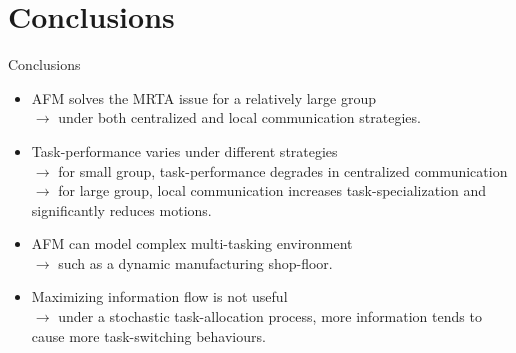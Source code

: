 \documentclass{beamer}
\begin{document}
\section{Conclusions}
\begin{frame}[t]{Conclusions}
\begin{itemize}
    \item \normalsize \alert{AFM solves the MRTA issue for a relatively large group}\\
    $\rightarrow$ \small under both centralized and local communication strategies.
    \item \normalsize \alert{Task-performance varies under different strategies}\\
    $\rightarrow$ \small for small group, task-performance degrades in centralized communication\\
    $\rightarrow$ \small for large group, local  communication increases task-specialization and significantly reduces motions.    
    \item \normalsize \alert{AFM can model complex multi-tasking environment}\\
    $\rightarrow$ \small such as a dynamic manufacturing shop-floor.
    \item \normalsize \alert{Maximizing information flow is not useful}\\
    $\rightarrow$ \small  under a stochastic task-allocation process, more information tends to cause more task-switching behaviours. %
 \end{itemize}
\end{frame}
\end{document}
